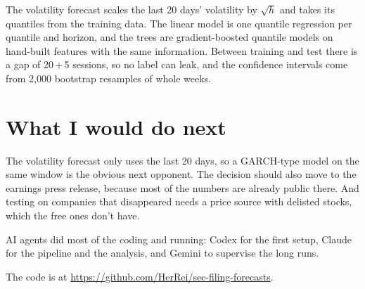 \documentclass[11pt,a4paper]{article}
\begin{document}
The volatility forecast scales the last 20 days' volatility by $\sqrt{h}$ and takes its quantiles from the training data. The linear model is one quantile regression per quantile and horizon, and the trees are gradient-boosted quantile models on hand-built features with the same information. Between training and test there is a gap of 20\,+\,5 sessions, so no label can leak, and the confidence intervals come from 2,000 bootstrap resamples of whole weeks.

\section*{What I would do next}

The volatility forecast only uses the last 20 days, so a GARCH-type model on the same window is the obvious next opponent. The decision should also move to the earnings press release, because most of the numbers are already public there. And testing on companies that disappeared needs a price source with delisted stocks, which the free ones don't have.

AI agents did most of the coding and running: Codex for the first setup, Claude for the pipeline and the analysis, and Gemini to supervise the long runs.

The code is at \url{https://github.com/HerRei/sec-filing-forecasts}.
\end{document}
